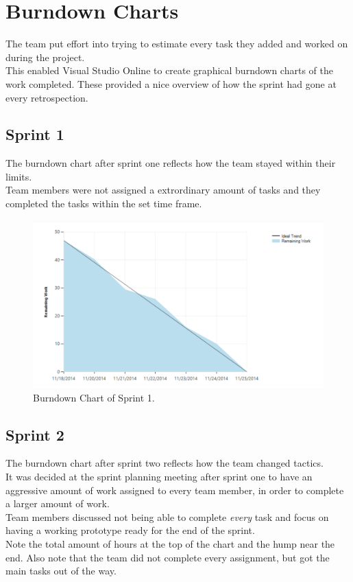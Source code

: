 \section{Burndown Charts}
The team put effort into trying to estimate every task they added and worked on during the project.\\
This enabled Visual Studio Online to create graphical burndown charts of the work completed. These provided a nice overview of how the sprint had gone at every retrospection.

\subsection{Sprint 1}
The burndown chart after sprint one reflects how the team stayed within their limits. \\
Team members were not assigned a extrordinary amount of tasks and they completed the tasks within the set time frame.

\begin{figure}[H]
	\centering
	\includegraphics[scale=0.40]{Figures/Burndown1}
	\caption{Burndown Chart of Sprint 1.}
\end{figure}

\subsection{Sprint 2}
The burndown chart after sprint two reflects how the team changed tactics. \\
It was decided at the sprint planning meeting after sprint one to have an aggressive amount of work assigned to every team member, in order to complete a larger amount of work. \\
Team members discussed not being able to complete \textit{every} task and focus on having a working prototype ready for the end of the sprint.\\
Note the total amount of hours at the top of the chart and the hump near the end. Also note that the team did not complete every assignment, but got the main tasks out of the way.

